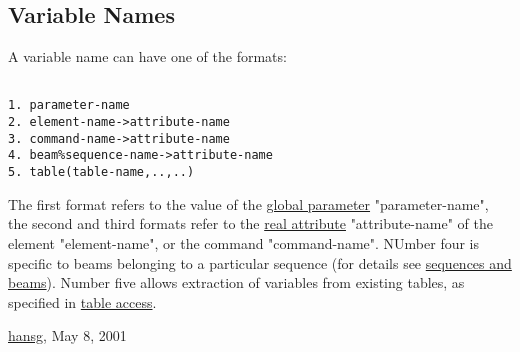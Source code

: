 




\subsection{Variable Names}
 A variable name can have one of the formats: 
\begin{verbatim}

1. parameter-name
2. element-name->attribute-name
3. command-name->attribute-name
4. beam%sequence-name->attribute-name
5. table(table-name,..,..)
\end{verbatim} The first format refers to the value of the \href{parameter.html}{global parameter} "parameter-name", the second and third formats refer to the  \href{real.html}{real attribute} "attribute-name" of the element "element-name", or the command "command-name". NUmber four is specific to beams belonging to a particular sequence (for details see  \href{sequence.html#beam}{sequences and beams}). Number five allows extraction of variables from existing tables, as specified in \href{expression.html#table}{table access}. 

\href{http://www.cern.ch/Hans.Grote/hansg_sign.html}{hansg}, May 8, 2001 

